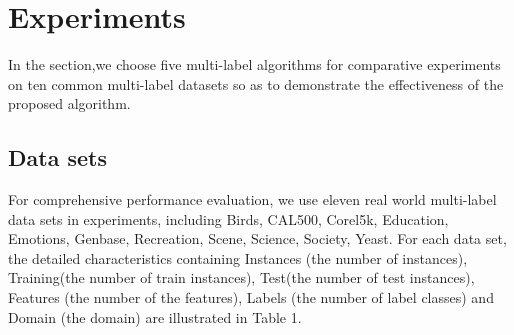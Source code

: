 \documentclass[final,3p,times]{elsarticle}
\begin{document}
\section{Experiments}In the section,we choose five multi-label algorithms for comparative experiments on ten common multi-label datasets so as to demonstrate the effectiveness of the proposed algorithm.

\subsection{Data sets}

For comprehensive performance evaluation, we use eleven real world multi-label data sets in experiments, including Birds, CAL500, Corel5k, Education, Emotions, Genbase, Recreation, Scene, Science, Society, Yeast. For each data set, the detailed characteristics containing Instances (the number of instances), Training(the number of train instances), Test(the number of test instances), Features (the number of the features), Labels (the number of label classes) and Domain (the domain) are illustrated in Table 1.
\end{document}
